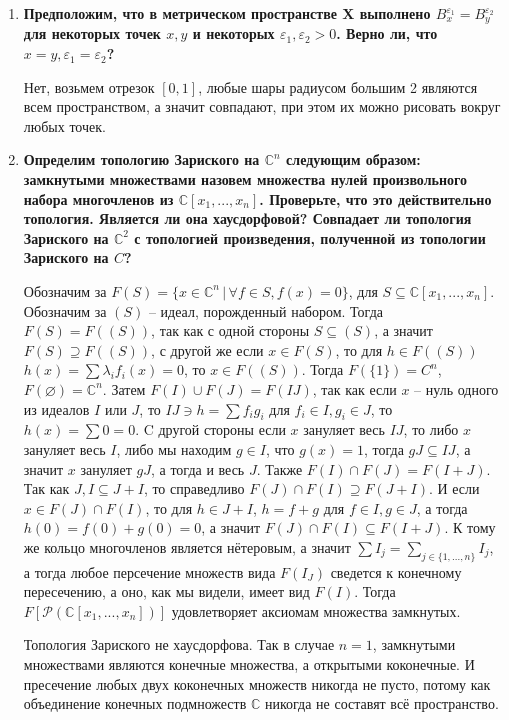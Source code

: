 \documentclass{article}
\begin{document}
\begin{enumerate}
    \item \textbf{Предположим, что в метрическом пространстве X выполнено
        $B^{\varepsilon_1}_x=B^{\varepsilon_2}_y$ для некоторых точек $x,y$ и
        некоторых $\varepsilon_1,\varepsilon_2>0$. Верно ли, что $x=y,
        \varepsilon_1=\varepsilon_2$?}

        Нет, возьмем отрезок $[0,1]$, любые шары радиусом большим 2 являются
        всем пространством, а значит совпадают, при этом их можно рисовать
        вокруг любых точек.

    \item \textbf{Определим топологию Зариского на $\mathbb{C}^n$ следующим
        образом: замкнутыми множествами назовем множества нулей произвольного
        набора многочленов из $\mathbb{C}[x_1,...,x_n]$. Проверьте, что это
        действительно топология. Является ли она хаусдорфовой? Совпадает ли
        топология Зариского на $\mathbb{C}^2$ с топологией произведения,
        полученной из топологии Зариского на $C$?}

        Обозначим за $F(S)=\{x\in\mathbb{C}^n\,|\,\forall f\in S, f(x)=0\}$,
        для $S\subseteq \mathbb{C}[x_1,...,x_n]$. Обозначим за $(S)$ – идеал,
        порожденный набором. Тогда $F(S)=F((S))$, так как с одной стороны
        $S\subseteq(S)$, а значит $F(S)\supseteq F((S))$, с другой же если
        $x\in F(S)$, то для $h\in F((S))$ $h(x)=\sum \lambda_i f_i(x) = 0$, то
        $x\in F((S))$. Тогда $F(\{1\})=C^n$, $F(\varnothing)=\mathbb{C}^n$. Затем
        $F(I)\cup F(J)=F(IJ)$, так как если $x$ – нуль одного из идеалов $I$ или
        $J$, то $IJ\ni h=\sum f_ig_i$ для $f_i\in I,g_i\in J$, то $h(x)=\sum0=0$.
        C другой стороны если $x$ зануляет весь $IJ$, то либо $x$ зануляет весь
        $I$, либо мы находим $g\in I$, что $g(x)=1$, тогда $gJ\subseteq IJ$,
        а значит $x$ зануляет $gJ$, а тогда и весь $J$. Также $F(I)\cap F(J)=
        F(I+J)$. Так как $J,I\subseteq J+I$, то справедливо $F(J)\cap F(I)
        \supseteq F(J+I)$. И если $x\in F(J)\cap F(I)$, то для $h\in J+I$,
        $h=f+g$ для $f\in I,g\in J$, а тогда $h(0)=f(0)+g(0)=0$, а значит
        $F(J)\cap F(I)\subseteq F(I+J)$. К тому же кольцо многочленов является
        нётеровым, а значит $\sum I_j=\sum_{j\in\{1,...,n\}}I_j$, а тогда любое
        персечение множеств вида $F(I_J)$ сведется к конечному пересечению,
        а оно, как мы видели, имеет вид $F(I)$. Тогда $F[\mathcal{P}(\mathbb{C}
        [x_1,...,x_n])]$ удовлетворяет аксиомам множества замкнутых.

        Топология Зариского не хаусдорфова. Так в случае $n=1$, замкнутыми
        множествами являются конечные множества, а открытыми коконечные. И
        пресечение любых двух коконечных множеств никогда не пусто, потому
        как объединение конечных подмножеств $\mathbb{C}$ никогда не составят
        всё пространство.


\end{enumerate}
\end{document}
